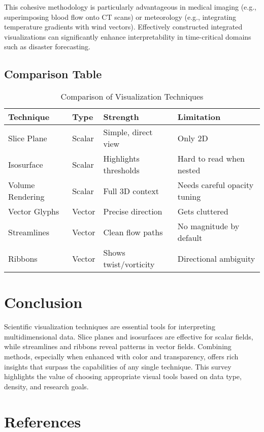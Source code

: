 \documentclass[11pt]{article}
\begin{document}
	This cohesive methodology is particularly advantageous in medical imaging (e.g., superimposing blood flow onto CT scans) or meteorology (e.g., integrating temperature gradients with wind vectors). Effectively constructed integrated visualizations can significantly enhance interpretability in time-critical domains such as disaster forecasting.
	
	\subsection{Comparison Table}
	
	\begin{table}[H]
		\centering
		\caption{Comparison of Visualization Techniques}
		\begin{tabular}{@{}llll@{}}
			\toprule
			\textbf{Technique} & \textbf{Type} & \textbf{Strength} & \textbf{Limitation} \\
			\midrule
			Slice Plane & Scalar & Simple, direct view & Only 2D \\
			Isosurface & Scalar & Highlights thresholds & Hard to read when nested \\
			Volume Rendering & Scalar & Full 3D context & Needs careful opacity tuning \\
			Vector Glyphs & Vector & Precise direction & Gets cluttered \\
			Streamlines & Vector & Clean flow paths & No magnitude by default \\
			Ribbons & Vector & Shows twist/vorticity & Directional ambiguity \\
			\bottomrule
		\end{tabular}
	\end{table}
	
	\section{Conclusion}
	Scientific visualization techniques are essential tools for interpreting multidimensional data. Slice planes and isosurfaces are effective for scalar fields, while streamlines and ribbons reveal patterns in vector fields. Combining methods, especially when enhanced with color and transparency, offers rich insights that surpass the capabilities of any single technique. This survey highlights the value of choosing appropriate visual tools based on data type, density, and research goals.
	
	\section{References}
	
\end{document}
